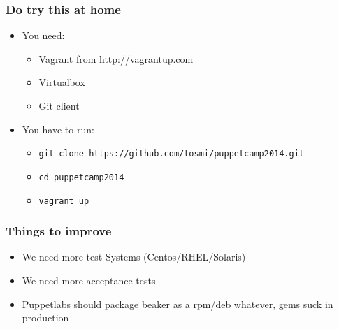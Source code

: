 \documentclass{beamer}
\begin{document}
\begin{frame}
\end{frame}

\begin{frame}
  \frametitle{Do try this at home}

  \begin{itemize}
  \item You need:
    \begin{itemize}
    \item Vagrant from \url{http://vagrantup.com}
    \item Virtualbox
    \item Git client
    \end{itemize}
  \item You have to run:
    \begin{itemize}
    \item \texttt{git clone https://github.com/tosmi/puppetcamp2014.git}
    \item \texttt{cd puppetcamp2014}
    \item \texttt{vagrant up}
    \end{itemize}
  \end{itemize}
\end{frame}

\begin{frame}
  \frametitle{Things to improve}

  \begin{itemize}
  \item We need more test Systems (Centos/RHEL/Solaris)
  \item We need more acceptance tests
  \item Puppetlabs should package beaker as a rpm/deb whatever, gems
    suck in production
  \end{itemize}
\end{frame}

\begin{frame}
\end{frame}
\end{document}
